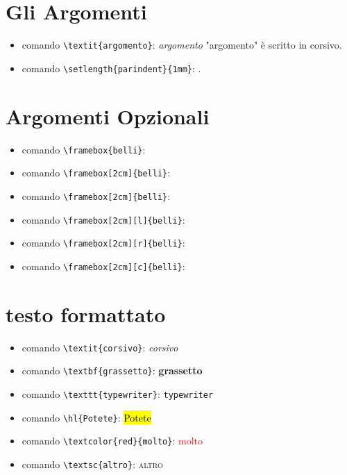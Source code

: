 \documentclass{report}
\begin{document}
        \section{Gli Argomenti}
            \begin{itemize}
                \item comando \verb!\textit{argomento}!: \textit{argomento} "argomento" è scritto in corsivo.
                \item comando \verb!\setlength{parindent}{1mm}!: \setlength{parindent}{1mm}.
            \end{itemize}   
        
        \section{Argomenti Opzionali}
            \begin{itemize}
                \item comando \verb!\framebox{belli}!: 
                \item comando \verb!\framebox[2cm]{belli}!:  
                \item comando \verb!\framebox[2cm]{belli}!:   
                \item comando \verb!\framebox[2cm][l]{belli}!:    
                \item comando \verb!\framebox[2cm][r]{belli}!:    
                \item comando \verb!\framebox[2cm][c]{belli}!: 
            \end{itemize}   

        \section{testo formattato}
            \begin{itemize}
                \item comando \verb!\textit{corsivo}!: \textit{corsivo}
                \item comando \verb!\textbf{grassetto}!: \textbf{grassetto}
                \item comando \verb!\texttt{typewriter}!: \texttt{typewriter}
                \item comando \verb!\hl{Potete}!: \hl{Potete}
                \item comando \verb!\textcolor{red}{molto}!: \textcolor{red}{molto}
                \item comando \verb!\textsc{altro}!: \textsc{altro}
            \end{itemize}
\end{document}
